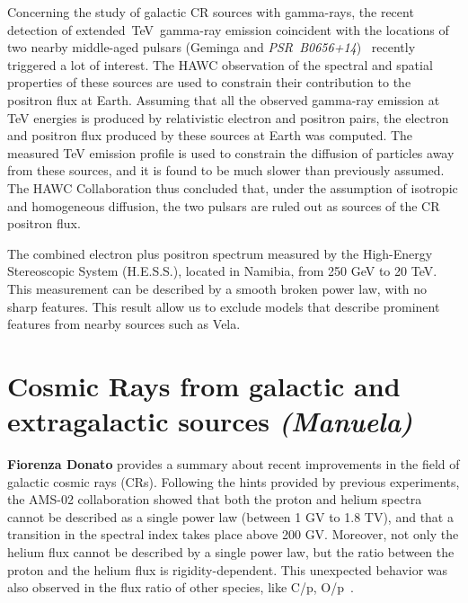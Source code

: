 \documentclass{PoS}
\begin{document}
Concerning the study of galactic CR sources with gamma-rays, the recent detection of extended~TeV~gamma-ray emission coincident with the 
locations of two nearby middle-aged pulsars (Geminga and \textit{PSR~B0656+14})~\cite{HAWCpositrons} recently triggered a lot of interest. The HAWC observation of the spectral and spatial properties of these sources are used
to constrain their contribution to the positron flux at Earth. Assuming that all the observed gamma-ray emission at TeV energies is
produced by relativistic electron and positron pairs, the electron and positron
flux produced by these sources at Earth was computed. The measured TeV emission profile is used to constrain the diffusion of particles away from these
sources, and it is found to be much slower than previously assumed. The HAWC Collaboration thus concluded that, under the assumption of isotropic and homogeneous diffusion, the two pulsars are ruled out as sources of the CR positron flux.


The combined electron plus positron spectrum  measured by the High-Energy Stereoscopic System (H.E.S.S.), located in Namibia, from 250 GeV to 20 TeV. This measurement can be described by a smooth broken power law, with no sharp features. This result allow us to exclude models that describe prominent features from nearby sources such as Vela.

\section{Cosmic Rays from galactic and extragalactic sources {\it (Manuela)}}
{\bf Fiorenza Donato} provides a summary about recent improvements in the field of galactic cosmic rays (CRs). Following the hints provided by previous experiments, the AMS-02 collaboration  showed 
that both the proton and helium spectra~\cite{proton}~\cite{Aguilar:2015ctt}
 cannot be described as a single power law (between 1 GV to 1.8 TV), and that
a transition in the spectral index takes place above 200 GV.  Moreover, not only the helium flux cannot be described by a single power law, but the ratio
between the proton and the helium flux is rigidity-dependent. This unexpected behavior was also observed in the flux ratio of other species,
like C/p, O/p~\cite{heco}. 
\end{document}
